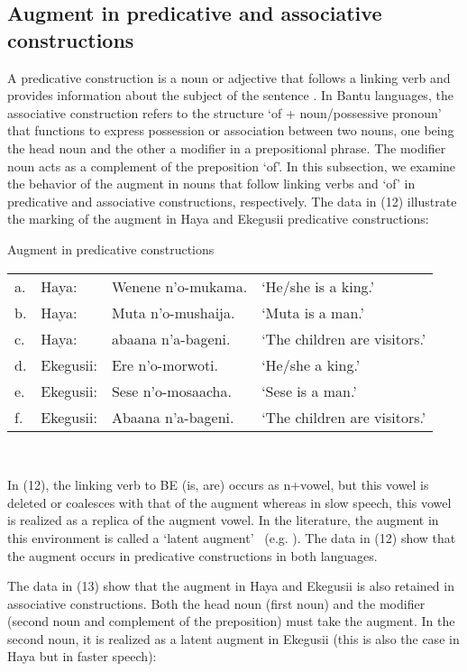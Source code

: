 \documentclass[output=paper]{langscibook}
\begin{document}
\subsection{Augment in predicative and associative constructions}
	A predicative construction is a noun or adjective that follows a linking verb and provides information about the subject of the sentence \citep{aarts2011oxford}. In Bantu languages, the associative construction refers to the structure ‘of + noun/possessive pronoun’ that functions to express possession or association between two nouns, one being the head noun and the other a modifier in a prepositional phrase. The modifier noun acts as a complement of the preposition ‘of’. In this subsection, we examine the behavior of the augment in nouns that follow linking verbs and ‘of’ in predicative and associative constructions, respectively. The data in (12) illustrate the marking of the augment in Haya and Ekegusii predicative constructions:

\begin{exe}
\ex Augment in predicative constructions\\
\label{hayagusii12}
\begin{tabular}{llll}
 a.	& Haya: &		Wenene n’o-mukama.	&	‘He/she is a king.’ \\
b.& 	Haya: 	&	Muta n’o-mushaija.	&	‘Muta is a man.’\\
c. &	Haya: 	&	abaana n’a-bageni.	&	‘The children are visitors.’\\
d. &	Ekegusii: &	Ere n’o-morwoti.	&	‘He/she a king.’\\
e. &	Ekegusii: &	Sese n’o-mosaacha.	&	‘Sese is a man.’\\
f. &	Ekegusii: &	Abaana n’a-bageni.	&	‘The children are visitors.’
\end{tabular}\\
\end{exe}
In (12), the linking verb to BE (is, are) occurs as n+vowel, but this vowel is deleted or coalesces with that of the augment whereas in slow speech, this vowel is realized as a replica of the augment vowel. In the literature, the augment in this environment is called a ‘latent augment’ \ (e.g. \citealt{blois1970augment}). The data in (12) show that the augment occurs in predicative constructions in both languages.

The data in (13) show that the augment in Haya and Ekegusii is also retained in associative constructions. Both the head noun (first noun) and the modifier (second noun and complement of the preposition) must take the augment. In the second noun, it is realized as a latent augment in Ekegusii (this is also the case in Haya but in faster speech):
\end{document}
